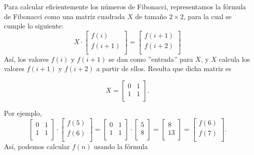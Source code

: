 \begin{samepage}
Para calcular eficientemente los números de Fibonacci,
representamos la
fórmula de Fibonacci como una
matriz cuadrada $X$ de tamaño $2 \times 2$,
para la cual se cumple lo siguiente:
\[ X \cdot
 \begin{bmatrix}
  f(i) \\
  f(i+1) \\
 \end{bmatrix}
=
 \begin{bmatrix}
  f(i+1) \\
  f(i+2) \\
 \end{bmatrix}
 \]
Así, los valores $f(i)$ y $f(i+1)$ se dan como
''entrada'' para $X$,
y $X$ calcula los valores $f(i+1)$ y $f(i+2)$
a partir de ellos.
Resulta que dicha matriz es

\[ X =
 \begin{bmatrix}
  0 & 1 \\
  1 & 1 \\
 \end{bmatrix}.
\]
\end{samepage}
\noindent
Por ejemplo,
\[
 \begin{bmatrix}
  0 & 1 \\
  1 & 1 \\
 \end{bmatrix}
\cdot
 \begin{bmatrix}
  f(5) \\
  f(6) \\
 \end{bmatrix}
=
 \begin{bmatrix}
  0 & 1 \\
  1 & 1 \\
 \end{bmatrix}
\cdot
 \begin{bmatrix}
  5 \\
  8 \\
 \end{bmatrix}
=
 \begin{bmatrix}
  8 \\
  13 \\
 \end{bmatrix}
=
 \begin{bmatrix}
  f(6) \\
  f(7) \\
 \end{bmatrix}.
\]
Así, podemos calcular $f(n)$ usando la fórmula
